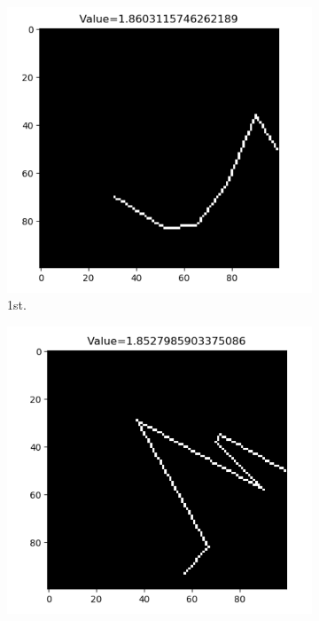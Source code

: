 \documentclass{mcmthesis}
\begin{document}
\begin{figure}[h]
	\centering
	\begin{subfigure}[b]{0.16\textwidth}
		\includegraphics[width=\textwidth]{figures/shot1.png}
		\caption{1st.}
	\end{subfigure}
	\begin{subfigure}[b]{0.16\textwidth}
		\includegraphics[width=\textwidth]{figures/shot2.png}

\end{subfigure}
\end{figure}
\end{document}
